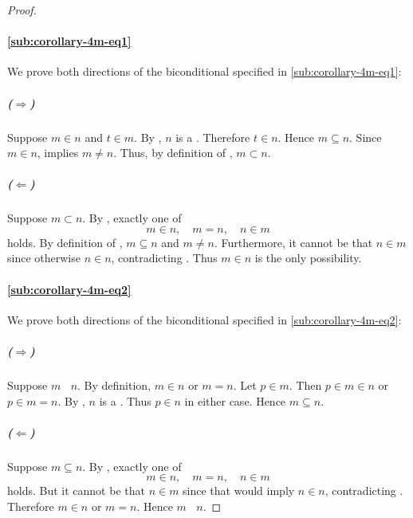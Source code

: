 \documentclass{report}
\newcommand{\ineq}{\,\mathop{\underline{\in}}\,}
\begin{document}
  \begin{proof}

    \paragraph{\eqref{sub:corollary-4m-eq1}}%

      We prove both directions of the biconditional specified in
        \eqref{sub:corollary-4m-eq1}:

      \subparagraph{($\Rightarrow$)}%

        Suppose $m \in n$ and $t \in m$.
        By , $n$ is a .
        Therefore $t \in n$.
        Hence $m \subseteq n$.
        Since $m \in n$,  implies
          $m \neq n$.
        Thus, by definition of , $m \subset n$.

      \subparagraph{($\Leftarrow$)}%

        Suppose $m \subset n$.
        By , exactly one of
          $$m \in n, \quad m = n, \quad n \in m$$ holds.
        By definition of , $m \subseteq n$ and
          $m \neq n$.
        Furthermore, it cannot be that $n \in m$ since otherwise $n \in n$,
          contradicting .
        Thus $m \in n$ is the only possibility.

    \paragraph{\eqref{sub:corollary-4m-eq2}}%

      We prove both directions of the biconditional specified in
        \eqref{sub:corollary-4m-eq2}:

      \subparagraph{($\Rightarrow$)}%

        Suppose $m \ineq n$.
        By definition, $m \in n$ or $m = n$.
        Let $p \in m$.
        Then $p \in m \in n$ or $p \in m = n$.
        By , $n$ is a .
        Thus $p \in n$ in either case.
        Hence $m \subseteq n$.

      \subparagraph{($\Leftarrow$)}%

        Suppose $m \subseteq n$.
        By , exactly one of
          $$m \in n, \quad m = n, \quad n \in m$$ holds.
        But it cannot be that $n \in m$ since that would imply $n \in n$,
          contradicting .
        Therefore $m \in n$ or $m = n$.
        Hence $m \ineq n$.

  \end{proof}
\end{document}
